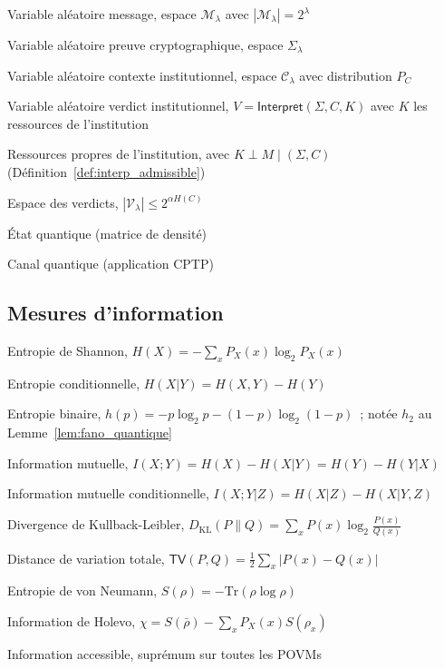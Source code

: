 \begin{sloppypar}
\begin{description}[style=nextline,leftmargin=1cm,font=\normalfont\bfseries]
\item[$M$] Variable al\'eatoire message, espace $\mathcal{M}_\lambda$ avec $|\mathcal{M}_\lambda| = 2^\lambda$
\item[$\Sigma$] Variable al\'eatoire preuve cryptographique, espace $\Sigma_\lambda$
\item[$C$] Variable al\'eatoire contexte institutionnel, espace $\mathcal{C}_\lambda$ avec distribution $P_C$
\item[$V$] Variable al\'eatoire verdict institutionnel, $V = \mathsf{Interpret}(\Sigma, C, K)$ avec $K$ les ressources de l'institution
\item[$K$] Ressources propres de l'institution, avec $K \perp M \mid (\Sigma, C)$ (D\'efinition~\ref{def:interp_admissible})
\item[$\mathcal{V}_\lambda$] Espace des verdicts, $|\mathcal{V}_\lambda| \leq 2^{\alpha H(C)}$
\item[$\rho$] \'Etat quantique (matrice de densit\'e)
\item[$\Lambda$] Canal quantique (application CPTP)
\end{description}

\subsection*{Mesures d'information}

\begin{description}[style=nextline,leftmargin=2cm,font=\normalfont\bfseries]
\item[$H(X)$] Entropie de Shannon, $H(X) = -\sum_x P_X(x)\log_2 P_X(x)$
\item[$H(X|Y)$] Entropie conditionnelle, $H(X|Y) = H(X,Y) - H(Y)$
\item[$h(p)$] Entropie binaire, $h(p) = -p\log_2 p - (1-p)\log_2(1-p)$~; not\'ee $h_2$ au Lemme~\ref{lem:fano_quantique}
\item[$I(X;Y)$] Information mutuelle, $I(X;Y) = H(X) - H(X|Y) = H(Y) - H(Y|X)$
\item[$I(X;Y|Z)$] Information mutuelle conditionnelle, $I(X;Y|Z) = H(X|Z) - H(X|Y,Z)$
\item[$D_{\mathrm{KL}}(P\|Q)$] Divergence de Kullback-Leibler, $D_{\mathrm{KL}}(P\|Q) = \sum_x P(x)\log_2\frac{P(x)}{Q(x)}$
\item[$\mathsf{TV}(P,Q)$] Distance de variation totale, $\mathsf{TV}(P,Q) = \frac{1}{2}\sum_x|P(x)-Q(x)|$
\item[$S(\rho)$] Entropie de von Neumann, $S(\rho) = -\mathrm{Tr}(\rho\log\rho)$
\item[$\chi$] Information de Holevo, $\chi = S(\bar{\rho}) - \sum_x P_X(x)S(\rho_x)$
\item[$I_{\mathrm{acc}}$] Information accessible, supr\'emum sur toutes les POVMs
\end{description}


\end{sloppypar}
